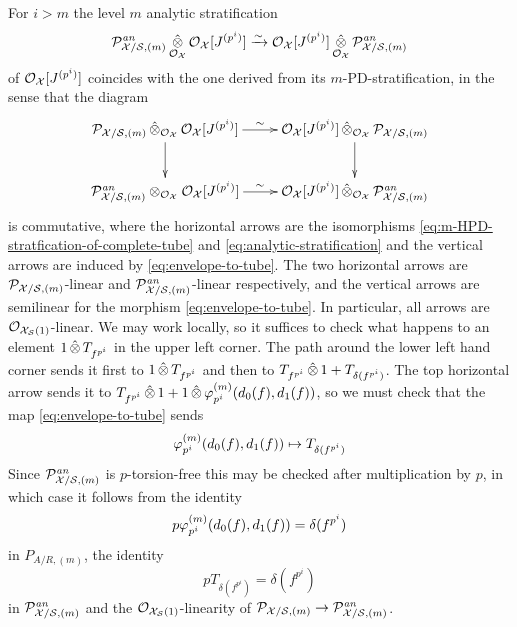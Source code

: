 \documentclass{article}
\theoremstyle{change}
\numberwithin{equation}{subsubsection}
\begin{document}
For $i>m$ the level $m$ analytic stratification
\begin{equation}
  \label{eq:analytic-stratification-of-O[J,m]}
  {\cal P}^{\mathit{an}}_{{\cal X}/{\cal S},(m)}\mathop{\hat\otimes}_{{\cal O}_{\cal X}}{\cal O}_{\cal X}[{J}^{({p^i})}]
  \xrightarrow{\sim}
  {\cal O}_{\cal X}[{J}^{({p^i})}]\mathop{\hat\otimes}_{{\cal O}_{\cal X}}{\cal P}^{\mathit{an}}_{{\cal X}/{\cal S},(m)}  
\end{equation}
of ${\cal O}_{\cal X}[{J}^{({p^i})}]$
coincides with the one derived from its $m$-PD-stratification, in the
sense that the diagram
\begin{equation}
  \label{eq:1st-tube-comparison}
  \xymatrix{
  \cP_{\cX/\cS,(m)}\ctens_{\O_\cX}\O_\cX[\niv{J}{p^i}]\ar[r]^\sim\ar[d]&
  \O_\cX[\niv{J}{p^i}]\ctens_{\O_\cX}\cP_{\cX/\cS,(m)}\ar[d]\\
  \cP^\an_{\cX/\cS,(m)}\tens_{\O_\cX}\O_\cX[\niv{J}{p^i}]\ar[r]^\sim&
  \O_\cX[\niv{J}{p^i}]\ctens_{\O_\cX}\cP^\an_{\cX/\cS,(m)}
  }
\end{equation}
is commutative, where the horizontal arrows are the isomorphisms
\ref{eq:m-HPD-stratfication-of-complete-tube} and
\ref{eq:analytic-stratification} and the vertical arrows are induced
by \ref{eq:envelope-to-tube}. The two horizontal arrows are
${\cal P}_{{\cal X}/{\cal S},(m)}$-linear and ${\cal P}^{\mathit{an}}_{{\cal X}/{\cal S},(m)}$-linear
respectively, and the vertical arrows are semilinear for the morphism
\ref{eq:envelope-to-tube}. In particular, all arrows are
${\cal O}_{{\cal X}_{\cal S}(1)}$-linear. We may work locally, so it suffices to check
what happens to an element $1\mathop{\hat\otimes} T_{f^{p^i}}$ in the upper left
corner. The path around the lower left hand corner sends it first to
$1\mathop{\hat\otimes} T_{f^{p^i}}$ and then to
$T_{f^{p^i}}\mathop{\hat\otimes}1+T_{\delta(f^{p^i})}$. The top horizontal arrow
sends it to
$T_{f^{p^i}}\mathop{\hat\otimes}1+1\mathop{\hat\otimes}{\varphi}^{({m})}_{p^i}(d_0(f),d_1(f))$, so
we must check that the map \ref{eq:envelope-to-tube} sends
\begin{displaymath}
  {\varphi}^{({m})}_{p^i}(d_0(f),d_1(f))
  \mapsto
  T_{\delta(f^{p^i})}
\end{displaymath}
Since ${\cal P}^{\mathit{an}}_{{\cal X}/{\cal S},(m)}$ is $p$-torsion-free this may be checked
after multiplication by $p$, in which case it follows from the
identity
\begin{displaymath}
  p{\varphi}^{({m})}_{p^i}(d_0(f),d_1(f))=\delta(f^{p^i})
\end{displaymath}
in $P_{A/R,(m)}$, the identity
\begin{displaymath}
  pT_{\delta(f^{p^i})}=\delta(f^{p^i})
\end{displaymath}
in ${\cal P}^{\mathit{an}}_{{\cal X}/{\cal S},(m)}$ and the ${\cal O}_{{\cal X}_{\cal S}(1)}$-linearity of
${\cal P}_{{\cal X}/{\cal S},(m)}\to {\cal P}^{\mathit{an}}_{{\cal X}/{\cal S},(m)}$.
\end{document}
